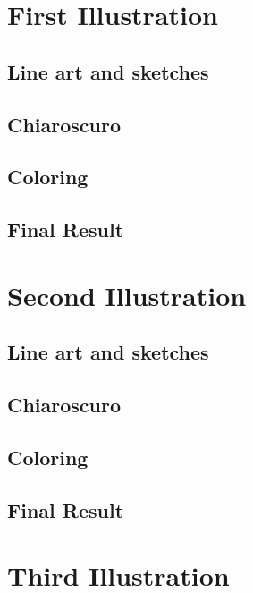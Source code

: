 \documentclass{cup-pan}
\begin{document}
\newpage
\section{First Illustration}
    \subsection{Line art and sketches}

    \subsection{Chiaroscuro}

    \subsection{Coloring}

    \subsection{Final Result}
\newpage
\newpage
\section{Second Illustration}

    \subsection{Line art and sketches}

    \subsection{Chiaroscuro}

    \subsection{Coloring}

    \subsection{Final Result}
\newpage
\newpage
\section{Third Illustration}
\end{document}

